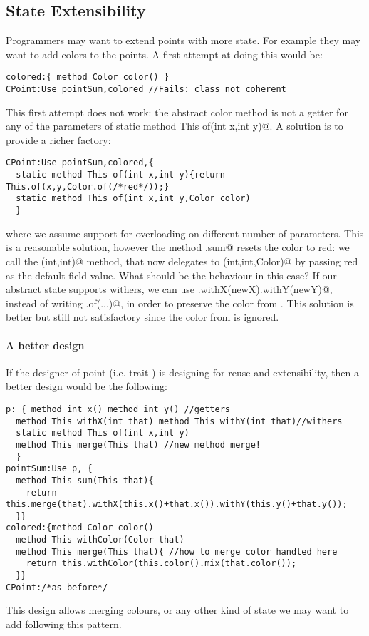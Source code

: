 \subsection{State Extensibility}
Programmers may want to extend points with more state. For example 
they may want to add colors to the points. A first attempt at doing
this would be:
\saveSpace
\begin{lstlisting}
colored:{ method Color color() }
CPoint:Use pointSum,colored //Fails: class not coherent
\end{lstlisting}
\saveSpace
This first attempt does not work: the abstract color method
is not a getter for any of the parameters of 
\Q@ static method This of(int x,int y)@. 
A solution is to provide a richer factory:
\saveSpace
\begin{lstlisting}
CPoint:Use pointSum,colored,{
  static method This of(int x,int y){return This.of(x,y,Color.of(/*red*/));}
  static method This of(int x,int y,Color color)
  }
\end{lstlisting}
\saveSpace
\noindent 
where we assume support for overloading on different number of parameters.
This is a reasonable solution, however the method \Q@CPoint.sum@ resets
the color to red: we call the \Q@of(int,int)@ method, that now
delegates to \Q@of(int,int,Color)@ by passing red as the default field
value.  What should be the behaviour in this case?  If our abstract
state supports withers, we can use
\Q@this.withX(newX).withY(newY)@, instead of writing \Q@This.of(...)@, in order to preserve the color from
\Q@this@.  This solution is better but still not satisfactory since the color from \Q@that@ is ignored.

\paragraph{A better design}
If the designer of point (i.e. trait \Q@p@) is designing for reuse and extensibility, then 
a better design would be the following:  
\saveSpace\begin{lstlisting}
p: { method int x() method int y() //getters
  method This withX(int that) method This withY(int that)//withers
  static method This of(int x,int y)
  method This merge(This that) //new method merge!
  }
pointSum:Use p, { 
  method This sum(This that){
    return this.merge(that).withX(this.x()+that.x()).withY(this.y()+that.y());
  }}
colored:{method Color color()
  method This withColor(Color that)
  method This merge(This that){ //how to merge color handled here
    return this.withColor(this.color().mix(that.color());
  }}
CPoint:/*as before*/
\end{lstlisting}  \saveSpace
  \noindent This design allows merging colours, or any other kind of state we may want to add
  following this pattern.%

